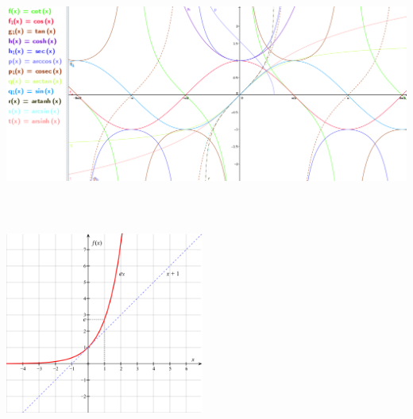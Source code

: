 \documentclass[6pt,a4paper]{scrartcl}
\begin{document}
\newpage
\begin{multicols}{2}
 \\
 \\
\includegraphics[height=8cm]{funktionen.png} \\
 \\
\includegraphics[height=6cm]{Exp_e.png} \\
\end{multicols}



\end{document}
